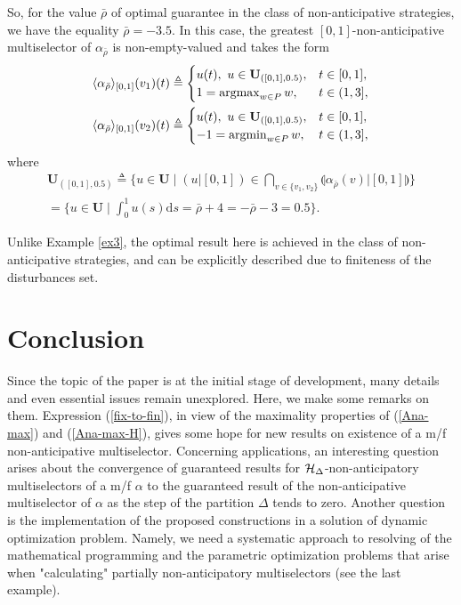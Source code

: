 \documentclass[sn-mathphys,Numbered,pdflatex]{sn-jnl}%
\theoremstyle{thmstyleone}%
\theoremstyle{thmstyletwo}%
\theoremstyle{thmstylethree}%
\newcommand\argmin{\operatornamewithlimits{\mathrm{argmin}}}
\newcommand\argmax{\operatornamewithlimits{\mathrm{argmax}}}
\newcommand{\mydef}{\mathrel{\triangleq}}%
\newcommand{\res}[2]{\ensuremath{(#1|#2)}}%
\newcommand{\sres}[2]{\llparenthesis#1|#2\rrparenthesis}%
\newcommand{\Ana}[2]{\ensuremath{\langle{#1}\rangle_{#2}}}%
\newcommand{\UB}{{\mathbf U}}%
\newcommand{\dup}{\mathrm{d}}%
\newcommand{\fref}[1]{{\rm(\ref{#1})}}   %
\begin{document}
So, for the value $\bar\rho$ of optimal guarantee in the class of non-anticipative strategies, we have the equality $\bar\rho=-3.5$.
In this case, the greatest $[0,1]$-non-anticipative multiselector of $\alpha_{\bar\rho}$ is non-empty-valued and takes the form
  \begin{gather*}%
         \Ana{\alpha_{\bar\rho}}{[0,1]}(v_1)(t)
         \mydef \begin{cases}
             u(t),\ u\in\UB_{([0,1],0.5)}, &t \in [0, 1], \\
             1=\argmax_{w\in P} w, &t \in (1, 3],
         \end{cases}\\
         \Ana{\alpha_{\bar\rho}}{[0,1]}(v_2)(t)
         \mydef \begin{cases}
             u(t),\ u\in\UB_{([0,1],0.5)}, &t \in [0, 1], \\
             - 1=\argmin_{w\in P}w, & t \in (1, 3],
         \end{cases}
     \end{gather*}
where
\begin{multline*}
\UB_{([0,1],0.5)}\mydef\Big\{u\in\UB\mid\res u{[0,1]}\in\bigcap_{v\in\{v_1,v_2\}}\sres{\alpha_{\bar\rho}(v)}{[0,1]}\Big\}\\
=\Big\{u\in\UB\mid\int_0^1u(s)\dup s=\bar\rho+4=-\bar\rho-3=0.5\Big\}.
\end{multline*}

Unlike Example \ref{ex3}, the optimal result here is achieved in the class of non-anticipative strategies, and can be explicitly described due to finiteness of the disturbances set.

\section{Conclusion}
\label{conc}
Since the topic of the paper is at the initial stage of development, many details and even essential issues remain unexplored.
Here, we make some remarks on them.
Expression \fref{fix-to-fin}, in view of the maximality properties of \fref{Ana-max} and \fref{Ana-max-H}, gives some hope for new results on existence of a m/f non-anticipative multiselector.
Concerning applications, an interesting question arises about the convergence of guaranteed results for ${\cal H}_\Delta$-non-anticipatory multiselectors of a m/f $\alpha$ to the guaranteed result of the non-anticipative multiselector of $\alpha$ as the step of the partition $\Delta$ tends to zero.
Another question is the implementation of the proposed constructions in a solution of dynamic optimization problem.
Namely, we need a systematic approach to resolving of the mathematical programming and the parametric optimization problems that arise when "calculating" partially non-anticipatory multiselectors (see the last example).

\end{document}

